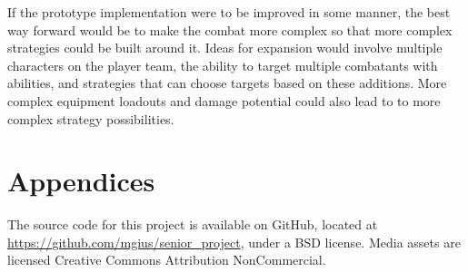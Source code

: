\documentclass[11pt]{article}
\begin{document}
If the prototype implementation were to be improved in some manner, the best way forward would be to make the combat more complex so that more complex strategies could be built around it.  Ideas for expansion would involve multiple characters on the player team, the ability to target multiple combatants with abilities, and strategies that can choose targets based on these additions. More complex equipment loadouts and damage potential could also lead to to more complex strategy possibilities.

\section{Appendices}

The source code for this project is available on GitHub, located at \url{https://github.com/mgius/senior_project}, under a BSD license.  Media assets are licensed Creative Commons Attribution NonCommercial.





\end{document}
